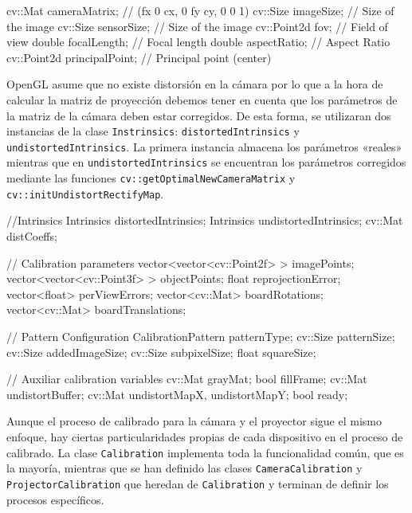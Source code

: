 \begin{listing}[
  float=ht,
  language = C++,
  caption  = {Atributos de la clase Intrinsics},
  label    = code:Intrinsics]
 cv::Mat cameraMatrix;       // (fx 0 cx, 0 fy cy, 0 0 1)
 cv::Size imageSize;         // Size of the image
 cv::Size sensorSize;        // Size of the image
 cv::Point2d fov;            // Field of view
 double focalLength;         // Focal length
 double aspectRatio;         // Aspect Ratio
 cv::Point2d principalPoint; // Principal point (center)
\end{listing}

OpenGL asume que no existe distorsión en la cámara por lo que a la hora de calcular la matriz de proyección debemos tener en cuenta que los parámetros de la matriz de la cámara deben estar corregidos. De esta forma, se utilizaran dos instancias de la clase \texttt{Instrinsics}: \texttt{distortedIntrinsics} y \texttt{undistortedIntrinsics}. La primera instancia almacena los parámetros «reales» mientras que en \texttt{undistortedIntrinsics} se encuentran los parámetros corregidos mediante las funciones \texttt{cv::getOptimalNewCameraMatrix} y \texttt{cv::initUndistortRectifyMap}.

\begin{listing}[
  float=ht,
  language = C++,
  caption  = {Atributos de la clase Calibration},
  label    = code:Calibration]
  //Intrinsics
  Intrinsics distortedIntrinsics;
  Intrinsics undistortedIntrinsics;
  cv::Mat distCoeffs;
  
  // Calibration parameters
  vector<vector<cv::Point2f> > imagePoints;
  vector<vector<cv::Point3f> > objectPoints;
  float reprojectionError;
  vector<float> perViewErrors;
  vector<cv::Mat> boardRotations;
  vector<cv::Mat> boardTranslations;

  // Pattern Configuration
  CalibrationPattern patternType;
  cv::Size patternSize;
  cv::Size addedImageSize;
  cv::Size subpixelSize;
  float squareSize;
 
  // Auxiliar calibration variables
  cv::Mat grayMat;
  bool fillFrame;
  cv::Mat undistortBuffer;
  cv::Mat undistortMapX, undistortMapY;
  bool ready;
 \end{listing}

Aunque el proceso de calibrado para la cámara y el proyector sigue el mismo enfoque, hay ciertas particularidades propias de cada dispositivo en el proceso de calibrado. La clase \texttt{Calibration} implementa toda la funcionalidad común, que es la mayoría, mientras que se han definido las clases \texttt{CameraCalibration} y \texttt{ProjectorCalibration} que heredan de \texttt{Calibration} y terminan de definir los procesos específicos.

